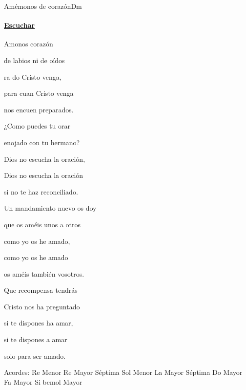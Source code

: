 \documentclass[12pt, spanish]{book}
\begin{document}
    \begin{song}{Amémonos de corazón}{Dm}
        {} %
        {}
        {} %
        {}
        \ifChordBk
        \paragraph{\mbox{}\hfill\protect\href{https://open.spotify.com/intl-es/track/41ylk76mwSEYfM5fppJnuI}{Escuchar}\mbox{}\hfill}
        \fi

        \begin{SBOpGroup}
            Amonos  corazón

             de labios ni de oídos 

            ra do Cristo venga,

            para cuan Cristo venga

            nos encuen preparados.
        \end{SBOpGroup}
        \vskip 20pt
        \begin{SBOpGroup}
            ¿Como puedes tu orar

            enojado con tu hermano?

            Dios no escucha la oración,

            Dios no escucha la oración

            si no te haz reconciliado.
        \end{SBOpGroup}
        \vskip 20pt
        \begin{SBOpGroup}
            Un mandamiento nuevo os doy

            que os améis unos a otros

            como yo os he amado,

            como yo os he amado

            os améis también vosotros.
        \end{SBOpGroup}
        \vskip 20pt
        \begin{SBOpGroup}
            Que recompensa tendrás

            Cristo nos ha preguntado

            si te dispones ha amar,

            si te dispones a amar

            solo para ser amado.
        \end{SBOpGroup}

        \ifChordBk
        \begin{SBOpGroup}
            Acordes:\break
            \upchord{\Dm}\qquad Re Menor \hfill
            \upchord{\Dseven}\qquad Re Mayor S\'eptima \hfill
            \upchord{\Gm}\qquad Sol Menor \hfill\null\break
            \upchord{\Aseven}\qquad La Mayor S\'eptima \hfill
            \upchord{\C}\qquad Do Mayor \hfill\null\break
            \upchord{\F}\qquad Fa Mayor \hfill
            \upchord{\Bflat}\qquad Si bemol Mayor \hfill\null\break
        \end{SBOpGroup}
        \fi
    \end{song}
\end{document}
